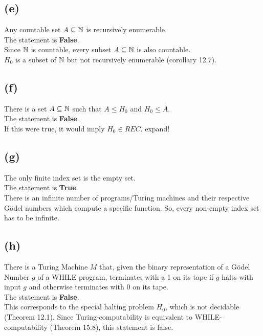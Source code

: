 \subsection{(e)}
Any countable set $A\subseteq\mathbb{N}$ is recursively enumerable.\\
The statement is \textbf{False}.\\
Since $\mathbb{N}$ is countable, every subset $A\subseteq\mathbb{N}$ is also countable.\\
$\overline{H_{0}}$ is a subset of $\mathbb{N}$ but not recursively enumerable (corollary 12.7).

\subsection{(f)}
There is a set $A\subseteq\mathbb{N}$ such that $A\leq H_{0}$ and $H_{0}\leq \overline{A}$.\\
The statement is \textbf{False}.\\
If this were true, it would imply $H_{0} \in REC$.{\color{red} expand!}

\subsection{(g)}
The only finite index set is the empty set.\\
The statement is \textbf{True}.\\
There is an infinite number of programs/Turing machines and their respective Gödel numbers which compute a specific function. So, every non-empty index set has to be infinite.

\subsection{(h)}
There is a Turing Machine $M$ that, given the binary representation of a Gödel Number $g$ of a \textsc{WHILE} program, terminates with a $1$ on its tape if $g$ halts with input $g$ and otherwise terminates with $0$ on its tape.\\
The statement is \textbf{False}.\\
This corresponds to the special halting problem $H_{0}$, which is not decidable (Theorem 12.1). Since Turing-computability is equivalent to \textsc{WHILE}-computability (Theorem 15.8), this statement is false.



